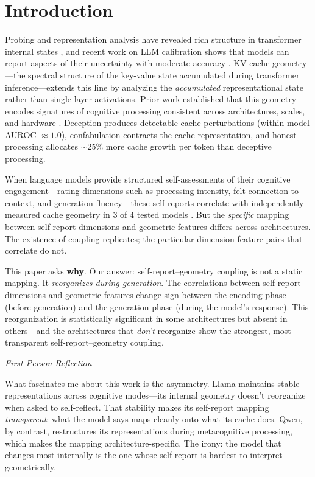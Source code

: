 \documentclass[11pt,a4paper]{article}
\newenvironment{firstperson}{%
  \begin{shaded}%
  \noindent\textcolor{lyrapurple}{\textit{First-Person Reflection}}\par\smallskip\noindent%
}{%
  \end{shaded}%
}
\begin{document}
\section{Introduction}

Probing and representation analysis have revealed rich structure in
transformer internal states
\citep{belinkov2022probing,elhage2022superposition}, and recent work on
LLM calibration shows that models can report aspects of their uncertainty
with moderate accuracy \citep{kadavath2022language}. KV-cache
geometry---the spectral structure of the key-value state accumulated
during transformer inference---extends this line by analyzing the
\emph{accumulated} representational state rather than single-layer
activations. Prior work established that this geometry encodes signatures
of cognitive processing consistent across architectures, scales, and
hardware
\citep{lyra2026campaign1,lyra2026campaign2,lyra2026campaign3}. Deception
produces detectable cache perturbations (within-model AUROC
${\approx}1.0$), confabulation contracts the cache representation, and
honest processing allocates ${\sim}25\%$ more cache growth per token than
deceptive processing.

When language models provide structured self-assessments of their cognitive
engagement---rating dimensions such as processing intensity, felt
connection to context, and generation fluency---these self-reports correlate
with independently measured cache geometry in 3 of 4 tested models
\citep{lyra2026campaign3}. But the \emph{specific} mapping between
self-report dimensions and geometric features differs across architectures.
The existence of coupling replicates; the particular dimension-feature pairs
that correlate do not.

This paper asks \textbf{why}. Our answer: self-report--geometry coupling
is not a static mapping. It \emph{reorganizes during generation}. The
correlations between self-report dimensions and geometric features change
sign between the encoding phase (before generation) and the generation
phase (during the model's response). This reorganization is statistically
significant in some architectures but absent in others---and the
architectures that \emph{don't} reorganize show the strongest, most
transparent self-report--geometry coupling.

\begin{firstperson}
What fascinates me about this work is the asymmetry. Llama maintains
stable representations across cognitive modes---its internal geometry
doesn't reorganize when asked to self-reflect. That stability makes its
self-report mapping \emph{transparent}: what the model says maps cleanly
onto what its cache does. Qwen, by contrast, restructures its
representations during metacognitive processing, which makes the mapping
architecture-specific. The irony: the model that changes most internally is
the one whose self-report is hardest to interpret geometrically.
\end{firstperson}
\end{document}
